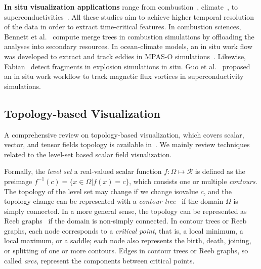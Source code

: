 

{\bf In situ visualization applications} range from combustion~\cite{YuWGCM10, BennettABGGJKKPPPTYZC12}, climate~\cite{WoodringPSPAH16}, to superconductivities~\cite{GuoPG17}.  All these studies aim to achieve higher temporal resolution of the data in order to extract time-critical features.
In combustion sciences, Bennett et al.~\cite{BennettABGGJKKPPPTYZC12} compute merge trees in combustion simulations by offloading the analyses into secondary resources.  
In ocean-climate models, an in situ work flow was developed to extract and track eddies in MPAS-O simulations~\cite{WoodringPSPAH16}.  
Likewise, Fabian~\cite{Fabian12} detect fragments in explosion simulations in situ.  
Guo et al.~\cite{GuoPG17} proposed an in situ work workflow to track magnetic flux vortices in superconductivity simulations.  





\subsection{Topology-based Visualization}

A comprehensive review on topology-based visualization, which covers scalar, vector, and tensor fields topology is available in~\cite{HeineLHIFSHG16}.  We mainly review techniques related to the level-set based scalar field visualization.  

Formally, the \emph{level set} a real-valued scalar function $f: \Omega\mapsto\mathcal{R}$ is defined as the preimage $f^{-1}(c) = \{x\in\Omega | f(x) = c \}$, which consists one or multiple \emph{contours}.  The topology of the level set may change if we change isovalue $c$, and the topology change can be represented with a \emph{contour tree}~\cite{} if the domain $\Omega$ is simply connected.  In a more general sense, the topology can be represented as Reeb graphs~\cite{Reeb46} if the domain is non-simply connected.  In contour trees or Reeb graphs, each node corresponds to a \emph{critical point}, that is, a local minimum, a local maximum, or a saddle; each node also represents the birth, death, joining, or splitting of one or more contours.  Edges in contour trees or Reeb graphs, so called \emph{arcs}, represent the components between critical points. 

